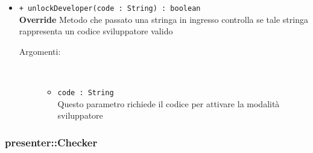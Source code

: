 \documentclass[../DefinizioneDiProdotto.tex]{subfiles}
\begin{document}
\begin{description}
\begin{itemize}
\begin{description}
\end{description}
\item \texttt{+ unlockDeveloper(code : String) : boolean}\\
\textbf{Override} Metodo che passato una stringa in ingresso controlla se tale stringa rappresenta un codice sviluppatore valido
 \begin{description}
\item[Argomenti:] \
\begin{itemize}
\item \texttt{code : String}\\
Questo parametro richiede il codice per attivare la modalità sviluppatore\end{itemize}
\end{description}
\end{itemize}
\end{description}

\subsubsection{presenter::Checker}
\end{document}

